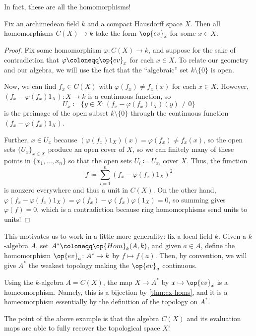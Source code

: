 \documentclass[../notes.tex]{subfiles}
\begin{document}
In fact, these are all the homomorphisms!
\begin{theorem} \label{thm:cx-homs}
	Fix an archimedean field $k$ and a compact Hausdorff space $X$. Then all homomorphisms $C(X)\to k$ take the form $\op{ev}_x$ for some $x\in X$.
\end{theorem}
\begin{proof}
	Fix some homomorphism $\varphi\colon C(X)\to k$, and suppose for the sake of contradiction that $\varphi\coloneqq\op{ev}_x$ for each $x\in X$. To relate our geometry and our algebra, we will use the fact that the ``algebraic'' set $k\setminus\{0\}$ is open.
	
	Now, we can find $f_x\in C(X)$ with $\varphi(f_x)\ne f_x(x)$ for each $x\in X$. However, $(f_x-\varphi(f_x)1_X)\colon X\to k$ is a continuous function, so
	\[U_x\coloneqq\{y\in X:(f_x-\varphi(f_x)1_X)(y)\ne0\}\]
	is the preimage of the open subset $k\setminus\{0\}$ through the continuous function $(f_x-\varphi(f_x)1_X)$.
	
	Further, $x\in U_x$ because $(\varphi(f_x)1_X)(x)=\varphi(f_x)\ne f_x(x)$, so the open sets $\{U_x\}_{x\in X}$ produce an open cover of $X$, so we can finitely many of these points in $\{x_1,\ldots,x_n\}$ so that the open sets $U_i\coloneqq U_{x_i}$ cover $X$. Thus, the function
	\[f\coloneqq\sum_{i=1}^n(f_x-\varphi(f_x)1_X)^2\]
	is nonzero everywhere and thus a unit in $C(X)$. On the other hand, $\varphi(f_x-\varphi(f_x)1_X)=\varphi(f_x)-\varphi(f_x)\varphi(1_X)=0$, so summing gives $\varphi(f)=0$, which is a contradiction because ring homomorphisms send units to units!
\end{proof}
This motivates us to work in a little more generality: fix a local field $k$. Given a $k$-algebra $A$, set $A^*\coloneqq\op{Hom}_k(A,k)$, and given $a\in A$, define the homomorphism $\op{ev}_a\colon A^*\to k$ by $f\mapsto f(a)$. Then, by convention, we will give $A^*$ the weakest topology making the $\op{ev}_a$ continuous.
\begin{example}
	Using the $k$-algebra $A=C(X)$, the map $X\to A^*$ by $x\mapsto\op{ev}_x$ is a homeomorphism. Namely, this is a bijection by \autoref{thm:cx-homs}, and it is a homeomorphism essentially by the definition of the topology on $A^*$.
\end{example}
The point of the above example is that the algebra $C(X)$ and its evaluation maps are able to fully recover the topological space $X$!
\end{document}
